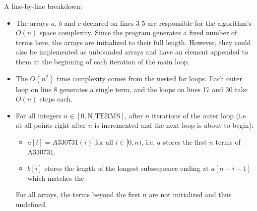 \documentclass{article}
\begin{document}
\newpage

A line-by-line breakdown:

\begin{itemize}
\item
  The arrays $a$, $b$ and $c$ declared on lines 3-5
  are responsible for the algorithm's $O(n)$ space complexity.
  Since the program generates a fixed number of terms here,
  the arrays are initialized to their full length.
  However, they could also be implemented as unbounded arrays
  and have an element appended to them at the beginning
  of each iteration of the main loop.
\item
  The $O(n^2)$ time complexity
  comes from the nested for loops. 
  Each outer loop on line 8 generates a single term,
  and the loops on lines 17 and 30 take $O(n)$ steps each.
\item
  For all integers $n \in [0, \text{N\_TERMS}]$,
  after $n$ iterations of the outer loop
  (i.e. at all points right after $n$ is incremented
  and the next loop is about to begin):
  \begin{itemize}
  \item
    $a[i] = A330731(i)$ for all $i \in [0, n)$,
    i.e. $a$ stores the first $n$ terms of A330731.
  \item
    $b[i]$ stores the length of the longest subsequence
    ending at $a[n-i-1]$
    which matches the 
  \end{itemize}
  For all arrays,
  the terms beyond the first $n$ are not initialized and thus undefined.
\end{itemize}
\end{document}
